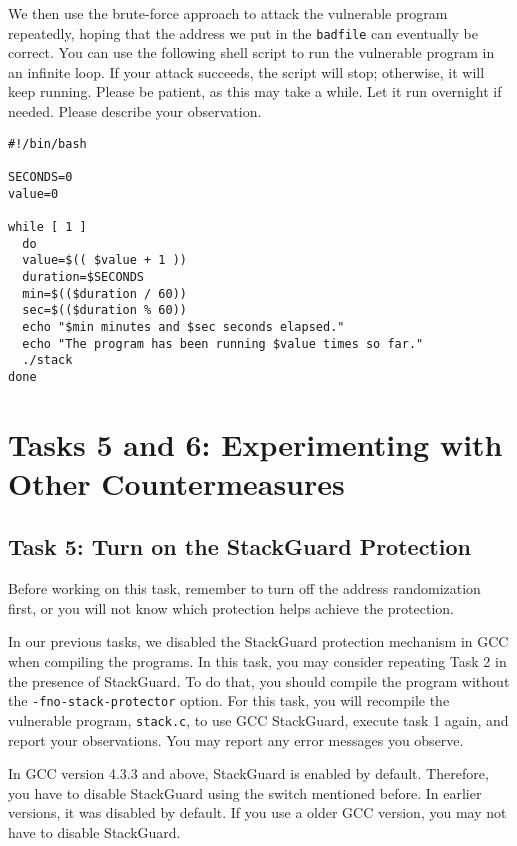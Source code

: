 We then use the brute-force approach to attack the vulnerable program repeatedly, hoping that 
the address we put in the \texttt{badfile} can eventually be correct. You can 
use the following shell script to run the vulnerable program in an infinite loop. If your
attack succeeds, the script will stop; otherwise, it will keep running. Please be patient,
as this may take a while. Let it run overnight if needed. Please describe your observation.


\begin{lstlisting}
#!/bin/bash

SECONDS=0
value=0

while [ 1 ]
  do
  value=$(( $value + 1 ))
  duration=$SECONDS
  min=$(($duration / 60))
  sec=$(($duration % 60))
  echo "$min minutes and $sec seconds elapsed."
  echo "The program has been running $value times so far."
  ./stack
done
\end{lstlisting}



\section{Tasks 5 and 6: Experimenting with Other Countermeasures}

\subsection{Task 5: Turn on the StackGuard Protection}

Before working on this task, remember to turn off the address
randomization first, or you will not know which protection helps 
achieve the protection.

In our previous tasks, we disabled the StackGuard protection mechanism in GCC
when compiling the programs. In this task, you may consider repeating
Task 2 
in the presence of StackGuard. To do that, you should compile
the program without the \texttt{-fno-stack-protector} option. For this
task, you will recompile the vulnerable program, \texttt{stack.c}, 
to use GCC StackGuard, execute task 1 again, and report your observations. You may
report any error messages you observe.

In GCC version 4.3.3 and above, StackGuard is enabled by
default. Therefore, you have to disable StackGuard using the switch
mentioned before. In earlier versions, it was disabled by default. If
you use a older GCC version, you may not have to disable StackGuard. 



